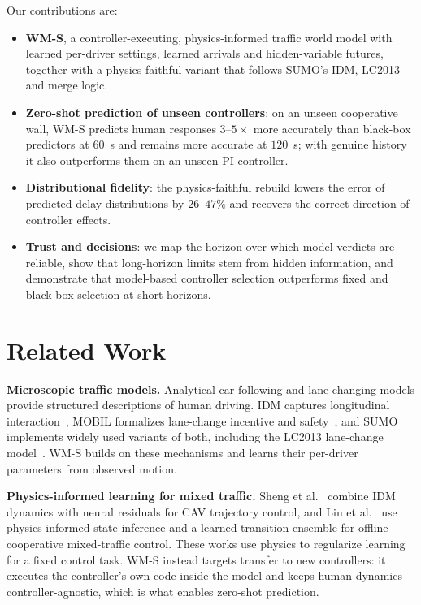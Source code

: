 \documentclass[conference]{IEEEtran}
\begin{document}
Our contributions are:
\begin{itemize}
\item \textbf{WM-S}, a controller-executing, physics-informed traffic world model with learned per-driver settings, learned arrivals and hidden-variable futures, together with a physics-faithful variant that follows SUMO's IDM, LC2013 and merge logic. %
\item \textbf{Zero-shot prediction of unseen controllers}: on an unseen cooperative wall, WM-S predicts human responses $3$--$5\times$ more accurately than black-box predictors at $60$~s and remains more accurate at $120$~s; with genuine history it also outperforms them on an unseen PI controller. %
\item \textbf{Distributional fidelity}: the physics-faithful rebuild lowers the error of predicted delay distributions by $26$--$47\%$ and recovers the correct direction of controller effects. %
\item \textbf{Trust and decisions}: we map the horizon over which model verdicts are reliable, show that long-horizon limits stem from hidden information, and demonstrate that model-based controller selection outperforms fixed and black-box selection at short horizons.
\end{itemize}

\section{Related Work}
\textbf{Microscopic traffic models.} Analytical car-following and lane-changing models provide structured descriptions of human driving. IDM captures longitudinal interaction~\cite{treiber_idm}, MOBIL formalizes lane-change incentive and safety~\cite{kesting_mobil}, and SUMO implements widely used variants of both, including the LC2013 lane-change model~\cite{lopez_sumo}. WM-S builds on these mechanisms and learns their per-driver parameters from observed motion.

\textbf{Physics-informed learning for mixed traffic.} Sheng et al.~\cite{sheng_residual} combine IDM dynamics with neural residuals for CAV trajectory control, and Liu et al.~\cite{liu_physics_wm} use physics-informed state inference and a learned transition ensemble for offline cooperative mixed-traffic control. These works use physics to regularize learning for a fixed control task. WM-S instead targets transfer to new controllers: it executes the controller's own code inside the model and keeps human dynamics controller-agnostic, which is what enables zero-shot prediction.
\end{document}
